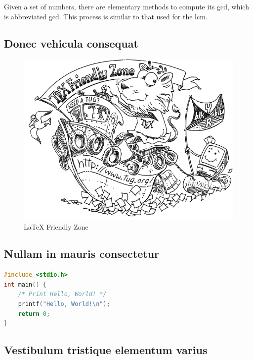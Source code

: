 Given a set of numbers, there are elementary methods to compute its \acrlong{gcd}, which is abbreviated \acrshort{gcd}. This process is similar to that used for the \acrfull{lcm}.

\subsection{Donec vehicula consequat}
\blindtext

\begin{figure}[!ht]
    \centering
    \includegraphics[width=.9\textwidth]{figures/tugboat}
    \caption{\LaTeX{} Friendly Zone \label{o:latex_friendly_zone}}
\end{figure}

\subsection{Nullam in mauris consectetur}
\blindtext

\begin{lstlisting}[language=C,caption={Program, ktorý pozdraví celý svet}]
#include <stdio.h>
int main() {
    /* Print Hello, World! */
    printf("Hello, World!\n");
    return 0;
}
\end{lstlisting}


\subsection{Vestibulum tristique elementum varius}
\blindtext

